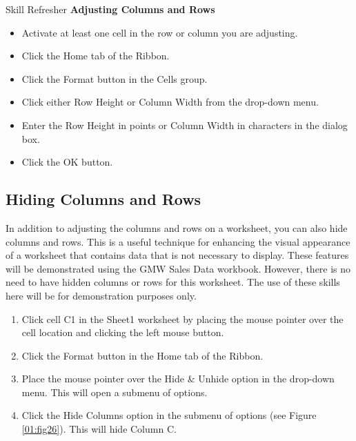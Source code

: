 \begin{center}
	\begin{sklbox}{Skill Refresher}
		\textbf{Adjusting Columns and Rows}
		\\
		\begin{itemize}
			\setlength{\itemsep}{0pt}
			\setlength{\parskip}{0pt}
			\setlength{\parsep}{0pt}
			
			\item Activate at least one cell in the row or column you are adjusting.
			\item Click the Home tab of the Ribbon.
			\item Click the Format button in the Cells group.
			\item Click either Row Height or Column Width from the drop-down menu.
			\item Enter the Row Height in points or Column Width in characters in the dialog box.
			\item Click the OK button.
			
		\end{itemize}
	\end{sklbox}
\end{center}

\subsection{Hiding Columns and Rows}

In addition to adjusting the columns and rows on a worksheet, you can also hide columns and rows. This is a useful technique for enhancing the visual appearance of a worksheet that contains data that is not necessary to display. These features will be demonstrated using the GMW Sales Data workbook. However, there is no need to have hidden columns or rows for this worksheet. The use of these skills here will be for demonstration purposes only.

\begin{enumerate}
	\item Click cell \textsf{C1} in the Sheet1 worksheet by placing the mouse pointer over the cell location and clicking the left mouse button.
	\item Click the Format button in the Home tab of the Ribbon.
	\item Place the mouse pointer over the Hide \& Unhide option in the drop-down menu. This will open a submenu of options.
	\item Click the Hide Columns option in the submenu of options (see Figure \ref{01:fig26}). This will hide Column \textsf{C}.
\end{enumerate}

